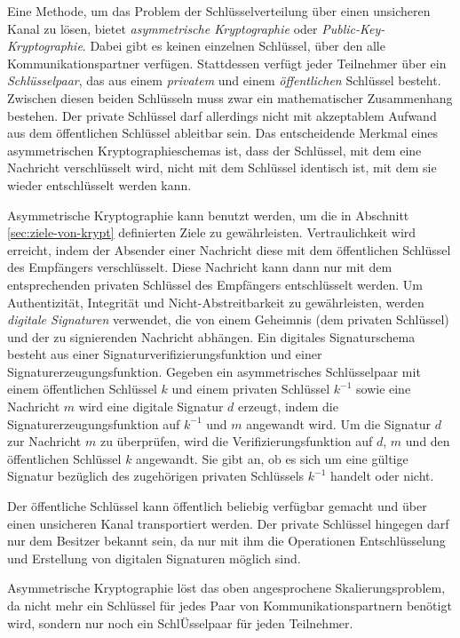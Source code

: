 Eine Methode, um das Problem der Schlüsselverteilung über einen
unsicheren Kanal zu lösen, bietet \emph{asymmetrische Kryptographie}
oder \emph{Public-Key-Kryptographie}. Dabei gibt es keinen einzelnen
Schlüssel, über den alle Kommunikationspartner
verfügen. Stattdessen verfügt jeder Teilnehmer über ein
\emph{Schlüsselpaar}, das aus einem \emph{privatem} und einem
\emph{öffentlichen} Schlüssel besteht. Zwischen diesen beiden
Schlüsseln muss zwar ein mathematischer Zusammenhang bestehen. Der
private Schlüssel darf allerdings nicht mit akzeptablem Aufwand aus
dem öffentlichen Schlüssel ableitbar sein. Das entscheidende
Merkmal eines asymmetrischen Kryptographieschemas ist, dass der
Schlüssel, mit dem eine Nachricht verschlüsselt wird, nicht mit
dem Schlüssel identisch ist, mit dem sie wieder entschlüsselt
werden kann.

Asymmetrische Kryptographie kann benutzt werden, um die in Abschnitt
\ref{sec:ziele-von-krypt} definierten Ziele zu
gewährleisten. Vertraulichkeit wird erreicht, indem der Absender
einer Nachricht diese mit dem öffentlichen Schlüssel des
Empfängers verschlüsselt. Diese Nachricht kann dann nur mit dem
entsprechenden privaten Schlüssel des Empfängers entschlüsselt
werden. Um Authentizität, Integrität und Nicht-Abstreitbarkeit zu
gewährleisten, werden \emph{digitale Signaturen} verwendet, die von
einem Geheimnis (dem privaten Schlüssel) und der zu signierenden
Nachricht abhängen. Ein digitales Signaturschema besteht aus einer
Signaturverifizierungsfunktion und einer
Signaturerzeugungsfunktion. Gegeben ein asymmetrisches Schlüsselpaar
mit einem öffentlichen Schlüssel $k$ und einem privaten
Schlüssel $k^{-1}$ sowie eine Nachricht $m$ wird eine digitale
Signatur $d$ erzeugt, indem die Signaturerzeugungsfunktion auf
$k^{-1}$ und $m$ angewandt wird. Um die Signatur $d$ zur Nachricht $m$
zu überprüfen, wird die Verifizierungsfunktion auf $d$, $m$ und
den öffentlichen Schlüssel $k$ angewandt. Sie gibt an, ob es sich
um eine gültige Signatur bezüglich des zugehörigen privaten
Schlüssels $k^{-1}$ handelt oder nicht.

Der öffentliche Schlüssel kann öffentlich beliebig verfügbar
gemacht und über einen unsicheren Kanal transportiert werden. Der
private Schlüssel hingegen darf nur dem Besitzer bekannt sein, da
nur mit ihm die Operationen Entschlüsselung und Erstellung von
digitalen Signaturen möglich sind.

Asymmetrische Kryptographie löst das oben angesprochene
Skalierungsproblem, da nicht mehr ein Schlüssel für jedes Paar von
Kommunikationspartnern benötigt wird, sondern nur noch ein
SchlÜsselpaar für jeden Teilnehmer.

